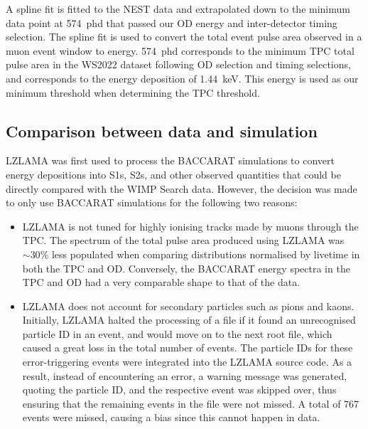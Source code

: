 A spline fit is fitted to the NEST data and extrapolated down to the minimum data point at 574~phd that passed our OD energy and inter-detector timing selection. The spline fit is used to convert the total event pulse area observed in a muon event window to energy. 574~phd corresponds to the minimum TPC total pulse area in the WS2022 dataset following OD selection and timing selections, and corresponds to the energy deposition of 1.44~keV. This energy is used as our minimum threshold when determining the TPC threshold.

\subsection{Comparison between data and simulation}\label{sec:Muons/MuonFluxDataSimComp}
LZLAMA was first used to process the BACCARAT simulations to convert energy depositions into S1s, S2s, and other observed quantities that could be directly compared with the WIMP Search data. However, the decision was made to only use BACCARAT simulations for the following two reasons:
\begin{itemize}
    \item LZLAMA is not tuned for highly ionising tracks made by muons through the TPC. The spectrum of the total pulse area produced using LZLAMA was $\sim30\%$ less populated when comparing distributions normalised by livetime in both the TPC and OD. Conversely, the BACCARAT energy spectra in the TPC and OD had a very comparable shape to that of the data.
    \item LZLAMA does not account for secondary particles such as pions and kaons. Initially, LZLAMA halted the processing of a file if it found an unrecognised particle ID in an event, and would move on to the next root file, which caused a great loss in the total number of events. The particle IDs for these error-triggering events were integrated into the LZLAMA source code. As a result, instead of encountering an error, a warning message was generated, quoting the particle ID, and the respective event was skipped over, thus ensuring that the remaining events in the file were not missed. A total of 767 events were missed, causing a bias since this cannot happen in data. 
\end{itemize}
